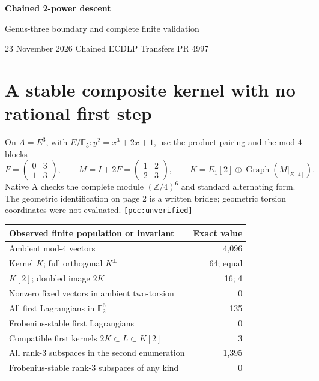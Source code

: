 \documentclass[10pt,a4paper]{article}
\begin{document}
{\LARGE\bfseries Chained 2-power descent}\par
{\large Genus-three boundary and complete finite validation}\par
23 November 2026 \quad Chained ECDLP Transfers \quad PR 4997

\medskip
{}

\section{A stable composite kernel with no rational first step}
On $A=E^3$, with $E/\mathbb F_5:y^2=x^3+2x+1$, use the product pairing
and the mod-$4$ blocks
\[
 F=\begin{pmatrix}0&3\\1&3\end{pmatrix},\qquad
 M=I+2F=\begin{pmatrix}1&2\\2&3\end{pmatrix},\qquad
 K=E_1[2]\oplus\operatorname{Graph}(M|_{E[4]}).
\]
Native A checks the complete module $(\mathbb Z/4)^6$ and standard alternating
form. The geometric identification on page 2 is a written bridge;
geometric torsion coordinates were not evaluated. \texttt{[pcc:unverified]}

\begin{center}
\begin{tabular}{@{}lr@{}}
\toprule
Observed finite population or invariant & Exact value\\
\midrule
Ambient mod-$4$ vectors & 4,096\\
Kernel $K$; full orthogonal $K^\perp$ & 64; equal\\
$K[2]$; doubled image $2K$ & 16; 4\\
Nonzero fixed vectors in ambient two-torsion & 0\\
All first Lagrangians in $\mathbb F_2^6$ & 135\\
Frobenius-stable first Lagrangians & 0\\
Compatible first kernels $2K\subset L\subset K[2]$ & 3\\
All rank-$3$ subspaces in the second enumeration & 1,395\\
Frobenius-stable rank-$3$ subspaces of any kind & 0\\
\bottomrule
\end{tabular}
\end{center}
\end{document}
